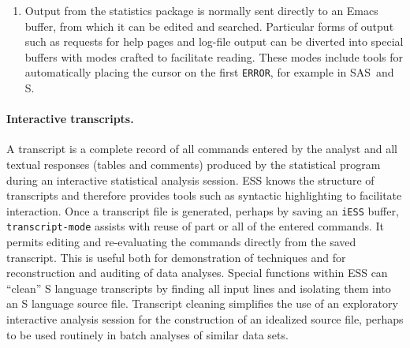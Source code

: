\documentclass{article}
\newcommand*{\SAS}{\textsc{SAS}}
\newcommand{\stexttt}[1]{{\small\texttt{#1}}}
\begin{document}
\begin{enumerate}
\item Output from the statistics package is normally sent directly to
  an Emacs buffer, from which it can be edited and searched.
  Particular forms of output such as requests for help pages and
  log-file output can be diverted into special buffers with modes
  crafted to facilitate reading.   These modes include tools for 
  automatically placing the cursor on the first \stexttt{ERROR},
  for example in \SAS\ and S. %


\end{enumerate}

\paragraph{Interactive transcripts.}
A transcript is a complete record of all commands entered by the
analyst and all textual responses (tables and comments) produced by
the statistical program during an interactive statistical analysis
session.  ESS knows the structure of transcripts and therefore
provides tools such as syntactic highlighting to facilitate
interaction.
Once a transcript file is generated, perhaps by saving an
\stexttt{iESS} buffer, \stexttt{transcript-mode} assists with reuse of
part or all of the entered commands.  It permits editing and
re-evaluating the commands directly from the saved transcript.  This
is useful both for demonstration of techniques and for reconstruction
and auditing of data analyses.  Special functions within ESS can
``clean'' S language transcripts by finding all input lines and
isolating them into an S language source file.  Transcript cleaning
simplifies the use of an exploratory interactive analysis session for
the construction of an idealized source file, perhaps to be used
routinely in batch analyses of similar data sets.
\end{document}
